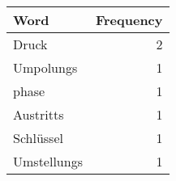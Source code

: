 \begin{tabular}{lr}
\toprule
Word & Frequency \\
\midrule
Druck & 2 \\
Umpolungs & 1 \\
phase & 1 \\
Austritts & 1 \\
Schlüssel & 1 \\
Umstellungs & 1 \\
\bottomrule
\end{tabular}
